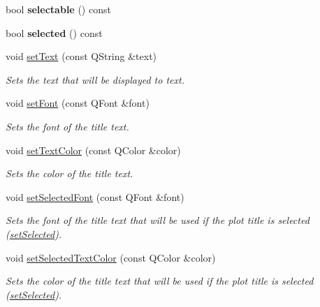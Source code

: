 \begin{DoxyCompactItemize}
\item 
\hypertarget{classQCPPlotTitle_a8d75c7cbcf2049c9512a3335d6f11416}{}bool {\bfseries selectable} () const \label{classQCPPlotTitle_a8d75c7cbcf2049c9512a3335d6f11416}

\item 
\hypertarget{classQCPPlotTitle_a9771f3a4bca026484d7c8b5d953b5e82}{}bool {\bfseries selected} () const \label{classQCPPlotTitle_a9771f3a4bca026484d7c8b5d953b5e82}

\item 
void \hyperlink{classQCPPlotTitle_aae5a93e88050dfb2cbf6adc087516821}{set\+Text} (const Q\+String \&text)
\begin{DoxyCompactList}\small\item\em Sets the text that will be displayed to {\itshape text}. \end{DoxyCompactList}\item 
void \hyperlink{classQCPPlotTitle_a199fc7170802ea65006c371875349e37}{set\+Font} (const Q\+Font \&font)
\begin{DoxyCompactList}\small\item\em Sets the {\itshape font} of the title text. \end{DoxyCompactList}\item 
void \hyperlink{classQCPPlotTitle_a71273e3a0ca6b4c151591b37b9e5ce33}{set\+Text\+Color} (const Q\+Color \&color)
\begin{DoxyCompactList}\small\item\em Sets the {\itshape color} of the title text. \end{DoxyCompactList}\item 
void \hyperlink{classQCPPlotTitle_a5245980ead999ceed51dbe702d0e3131}{set\+Selected\+Font} (const Q\+Font \&font)
\begin{DoxyCompactList}\small\item\em Sets the {\itshape font} of the title text that will be used if the plot title is selected (\hyperlink{classQCPPlotTitle_a8d441a889d371307df86f1ab7687a333}{set\+Selected}). \end{DoxyCompactList}\item 
void \hyperlink{classQCPPlotTitle_a09ffd8c52ac8824d00382f84be391b66}{set\+Selected\+Text\+Color} (const Q\+Color \&color)
\begin{DoxyCompactList}\small\item\em Sets the {\itshape color} of the title text that will be used if the plot title is selected (\hyperlink{classQCPPlotTitle_a8d441a889d371307df86f1ab7687a333}{set\+Selected}). \end{DoxyCompactList}\item 

\end{DoxyCompactItemize}
